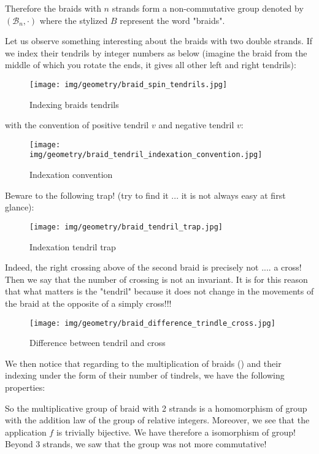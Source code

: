 {	 Therefore the braids with $n$ strands form a non-commutative group denoted by $(\mathcal{B}_n,\cdot)$ where the stylized $B$ represent the word "braids".
	 
	 Let us observe something interesting about the braids with two double strands. If we index their tendrils by integer numbers as below (imagine the braid from the middle of which you rotate the ends, it gives all other left and right tendrils):
	 \begin{figure}[H]
		\centering
		\texttt{[image: img/geometry/braid\_spin\_tendrils.jpg]}
		\caption{Indexing braids tendrils}
	\end{figure}
	with the convention of positive tendril $v$ and negative tendril $v$:
	\begin{figure}[H]
		\centering
		\texttt{[image: img/geometry/braid\_tendril\_indexation\_convention.jpg]}
		\caption{Indexation convention}
	\end{figure}
	Beware to the following trap! (try to find it ... it is not always easy at first glance):
	\begin{figure}[H]
		\centering
		\texttt{[image: img/geometry/braid\_tendril\_trap.jpg]}
		\caption{Indexation tendril trap}
	\end{figure}
	Indeed, the right crossing above of the second braid is precisely not .... a cross! Then we say that the number of crossing is not an invariant. It is for this reason that what matters is the "tendril" because it does not change in the movements of the braid at the opposite of a simply cross!!!
	\begin{figure}[H]
		\centering
		\texttt{[image: img/geometry/braid\_difference\_trindle\_cross.jpg]}
		\caption{Difference between tendril and cross}
	\end{figure}
	We then notice that regarding to the multiplication of braids () and their indexing under the form of their number of tindrels, we have the following properties:
	
	So the multiplicative group of braid with 2 strands is a homomorphism of group with the addition law of the group of relative integers. Moreover, we see that the application $f$ is trivially bijective. We have therefore a isomorphism of group! Beyond 3 strands, we saw that the group was not more commutative!
	
}

